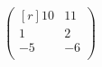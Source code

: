 \documentclass[a4paper]{article}
\begin{document}
	\[
	\begin{pmatrix*}[r]
		10 & 11 \\
		1 & 2 \\
		-5 & -6 \\
	\end{pmatrix*}
	\]
\end{document}
